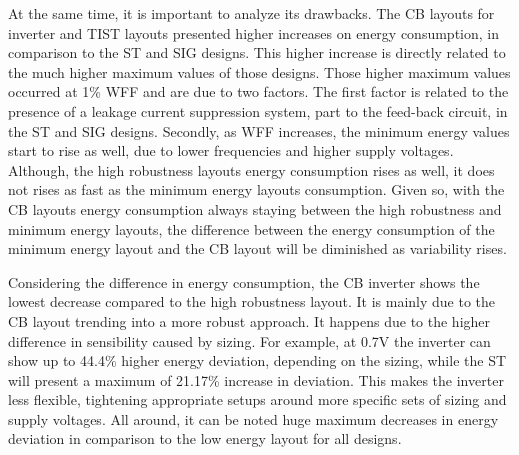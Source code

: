 \documentclass[pgmicro,mestrado,english]{iiufrgs}
\begin{document}
    At the same time, it is important to analyze its drawbacks. The CB layouts for inverter and TIST layouts presented higher increases on energy consumption, in comparison to the ST and SIG designs. This higher increase is directly related to the much higher maximum values of those designs. Those higher maximum values occurred at 1\% WFF and are due to two factors. The first factor is related to the presence of a leakage current suppression system, part to the feed-back circuit, in the ST and SIG designs. Secondly, as WFF increases, the minimum energy values start to rise as well, due to lower frequencies and higher supply voltages. Although, the high robustness layouts energy consumption rises as well, it does not rises as fast as the minimum energy layouts consumption. Given so, with the CB layouts energy consumption always staying between the high robustness and minimum energy layouts, the difference between the energy consumption of the minimum energy layout and the CB layout will be diminished as variability rises. 
    
    Considering the difference in energy consumption, the CB inverter shows the lowest decrease compared to the high robustness layout. It is mainly due to the CB layout trending into a more robust approach. It happens due to the higher difference in sensibility caused by sizing. For example, at 0.7V the inverter can show up to 44.4\% higher energy deviation, depending on the sizing, while the ST will present a maximum of 21.17\% increase in deviation. This makes the inverter less flexible, tightening appropriate setups around more specific sets of sizing and supply voltages. All around, it can be noted huge maximum decreases in energy deviation in comparison to the low energy layout for all designs.
    
    
    
\end{document}
